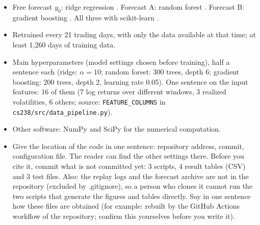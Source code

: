 \documentclass{article}
\newenvironment{pts}{\begin{itemize}[nosep,leftmargin=1.15em,topsep=1pt]}{\end{itemize}}
\begin{document}
\begin{note}
\begin{pts}
\item Free forecast $y_0$: ridge regression \citep{hoerl1970ridge}. Forecast A: random forest \citep{breiman2001random}. Forecast B: gradient boosting \citep{friedman2001greedy}. All three with scikit-learn \citep{pedregosa2011scikit}.
\item Retrained every 21 trading days, with only the data available at that time; at least 1{,}260 days of training data.
\item Main hyperparameters (model settings chosen before training), half a sentence each (ridge: $\alpha=10$; random forest: 300 trees, depth 6; gradient boosting: 200 trees, depth 2, learning rate 0.05). One sentence on the input features: 16 of them (7 log returns over different windows, 3 realized volatilities, 6 others; source: \texttt{FEATURE\_COLUMNS} in \texttt{cs238/src/data\_pipeline.py}).
\item Other software: NumPy \citep{harris2020numpy} and SciPy \citep{virtanen2020scipy} for the numerical computation.
\item Give the location of the code in one sentence: repository address, commit, configuration file. The reader can find the other settings there. Before you cite it, commit what is not committed yet: 3 scripts, 4 result tables (CSV) and 3 test files. Also: the replay logs and the forecast archive are not in the repository (excluded by .gitignore), so a person who clones it cannot run the two scripts that generate the figures and tables directly. Say in one sentence how these files are obtained (for example: rebuilt by the GitHub Actions workflow of the repository; confirm this yourselves before you write it).
\end{pts}
\end{note}
\end{document}
